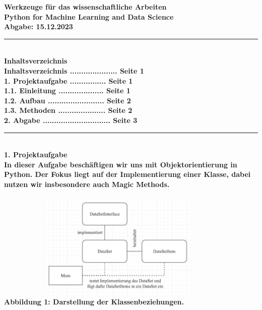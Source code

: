 \documentclass[]{article}
\begin{document}
\bf 
\Large\noindent  Werkzeuge für das wissenschaftliche Arbeiten\\
\normalsize Python for Machine Learning and Data Science\\
\normalfont \hspace*{4.5cm}Abgabe: 15.12.2023\\
\hrule\hfill\\[0.2cm]
\bf \large Inhaltsverzeichnis \normalsize \normalfont\\[0.5cm]
\hspace*{0.5cm} Inhaltsverzeichnis ..................... Seite 1 \\[0.2cm]
\hspace*{0.5cm} \bf 1. Projektaufgabe \normalfont ................ Seite 1 \\
\hspace*{1cm}  1.1. Einleitung .................... Seite 1 \\
\hspace*{1cm}  1.2. Aufbau ......................... Seite 2 \\
\hspace*{1cm}  1.3. Methoden ..................... Seite 2 \\[0.2cm]
\hspace*{0.5cm} \bf 2. Abgabe \normalfont .............................. Seite 3 \\
\hrule\hfill\\[0.2cm]
\bf \large 1. Projektaufgabe \normalsize \normalfont\\[0.5cm]
In dieser Aufgabe beschäftigen wir uns mit Objektorientierung in Python.
Der Fokus liegt auf der Implementierung einer Klasse, dabei nutzen wir insbesondere auch Magic Methods.\\
\\
\hspace*{2cm}\includegraphics[width=12cm, height=5cm]{./../diagram/classes_files.png}\\
\hspace*{3cm}\scriptsize\bf Abbildung 1: \normalfont Darstellung der Klassenbeziehungen.\normalsize\\
\end{document}
